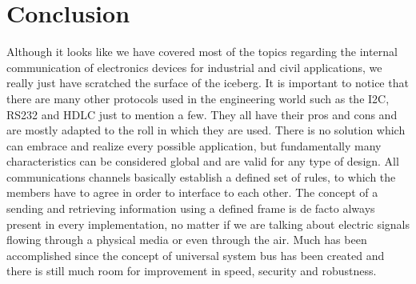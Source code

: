 \documentclass{article}
\begin{document}
\section{Conclusion}
Although it looks like we have covered most of the topics regarding the internal communication of electronics devices for industrial and civil applications, we really just have scratched the surface of the iceberg. 
\newline
\newline
It is important to notice that there are many other protocols used in the engineering world such as the I2C, RS232 and HDLC just to mention a few. They all have their pros and cons and are mostly adapted to the roll in which they are used.
\newline
\newline
There is no solution which can embrace and realize every possible application, but fundamentally many characteristics can be considered global and are valid for any type of design. 
\newline
\newline
All communications channels basically establish a defined set of rules, to which the members have to agree in order to interface to each other. The concept of a sending and retrieving information using a defined frame is de facto always present in every implementation, no matter if we are talking about electric signals flowing through a physical media or even through the air.
\newline
\newline
Much has been accomplished since the concept of universal system bus has been created and there is still much room for improvement in speed, security and robustness.
\end{document}
